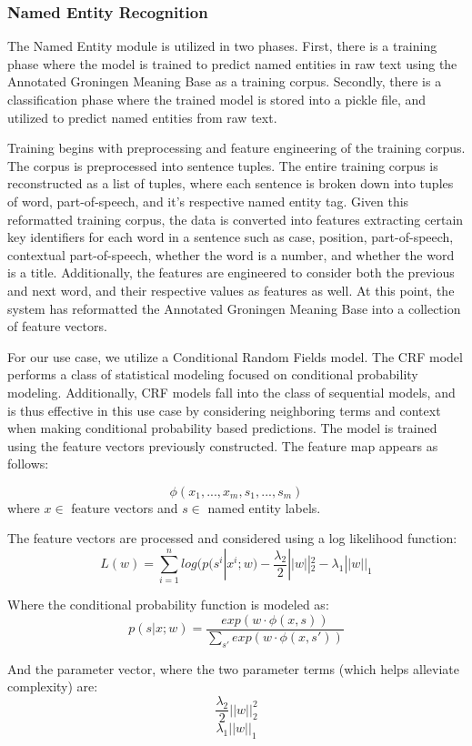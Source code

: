 \documentclass[11pt,a4paper]{article}
\begin{document}
\subsubsection{Named Entity Recognition}
The Named Entity module is utilized in two phases. First, there is a training phase where the model is trained to predict named entities in raw text using the Annotated Groningen Meaning Base as a training corpus. Secondly, there is a classification phase where the trained model is stored into a pickle file, and utilized to predict named entities from raw text. 

Training begins with preprocessing and feature engineering of the training corpus. The corpus is preprocessed into sentence tuples. The entire training corpus is reconstructed as a list of tuples, where each sentence is broken down into tuples of word, part-of-speech, and it’s respective named entity tag. Given this reformatted training corpus, the data is converted into features extracting certain key identifiers for each word in a sentence such as case, position, part-of-speech, contextual part-of-speech, whether the word is a number, and whether the word is a title. Additionally, the features are engineered to consider both the previous and next word, and their respective values as features as well.  At this point, the system has reformatted the Annotated Groningen Meaning Base into a collection of feature vectors. 

For our use case, we utilize a Conditional Random Fields model. The CRF model performs a class of statistical modeling focused on conditional probability modeling. Additionally, CRF models fall into the class of sequential models, and is thus effective in this use case by considering neighboring terms and context when making conditional probability based predictions. The model is trained using the feature vectors previously constructed. The feature map appears as follows:

$$\phi(x_1, ...,x_m, s_1,...,s_m)$$ where $x \in$ feature vectors and $s \in $ named entity labels.

The feature vectors are processed and considered using a log likelihood function:
$$L(w) = \sum_{i=1}^{n}log(p(s^i|x^i; w) - \frac{\lambda_2}{2} ||w||^2_2 - \lambda_1||w||_1$$

Where the conditional probability function is modeled as:
$$p(s|x;w) = \frac{exp(w \cdot \phi(x,s))}{\sum_{s'}exp(w \cdot \phi(x,s'))}$$

And the parameter vector, where the two parameter terms (which helps alleviate complexity) are:
$$\frac{\lambda_2}{2} ||w||^2_2$$ $$\lambda_1||w||_1$$
\end{document}
